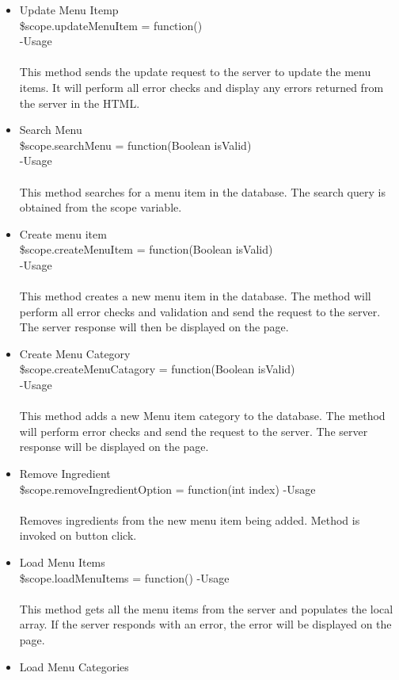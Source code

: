 \documentclass[a4paper,12pt]{report}
\begin{document}
\begin{enumerate}
\begin{itemize}
		\item Update Menu Itemp\\
		\$scope.updateMenuItem = function()\\
		-Usage\\ \\
		This method sends the update request to the server to update the menu items. It will perform all error checks and display any errors returned from the server in the HTML.
		\item Search Menu\\
		\$scope.searchMenu = function(Boolean isValid)\\
		-Usage\\ \\
		This method searches for a menu item in the database. The search query is obtained from the scope variable.
		\item Create menu item\\
		\$scope.createMenuItem = function(Boolean isValid)\\
		-Usage\\ \\
		This method creates a new menu item in the database. The method will perform all error checks and validation and send the request to the server. The server response will then be displayed on the page.
		\item Create Menu Category\\
		\$scope.createMenuCatagory = function(Boolean isValid)\\
		-Usage\\ \\
		This method adds a new Menu item category to the database. The method will perform error checks and send the request to the server. The server response will be displayed on the page.
		\item Remove Ingredient\\
		\$scope.removeIngredientOption = function(int index)
		-Usage\\ \\
		Removes ingredients from the  new menu item being added. Method is invoked on button click.
		\item Load Menu Items\\
		\$scope.loadMenuItems = function()
		-Usage\\ \\
		This method gets all the menu items from the server and populates the local array. If the server responds with an error, the error will be displayed on the page.
		\item Load Menu Categories\\

\end{itemize}
\end{enumerate}
\end{document}
